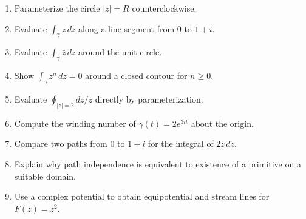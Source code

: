 \begin{enumerate}[label=\textbf{\arabic*.},leftmargin=*]
\item Parameterize the circle $|z|=R$ counterclockwise.
\item Evaluate $\int_\gamma z\,dz$ along a line segment from $0$ to $1+i$.
\item Evaluate $\int_\gamma \bar z\,dz$ around the unit circle.
\item Show $\int_\gamma z^n\,dz=0$ around a closed contour for $n\ge0$.
\item Evaluate $\oint_{|z|=2}dz/z$ directly by parameterization.
\item Compute the winding number of $\gamma(t)=2e^{3it}$ about the origin.
\item Compare two paths from $0$ to $1+i$ for the integral of $2z\,dz$.
\item Explain why path independence is equivalent to existence of a primitive on a suitable domain.
\item Use a complex potential to obtain equipotential and stream lines for $F(z)=z^2$.
\end{enumerate}

